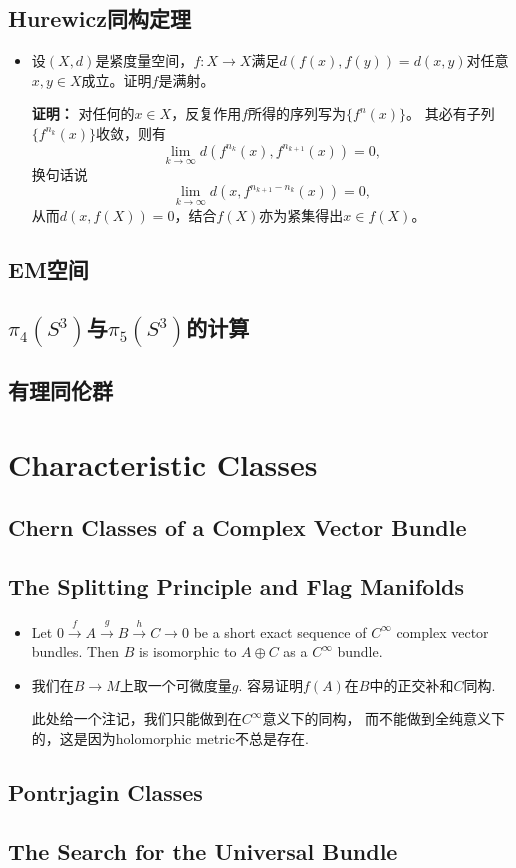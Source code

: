\subsection{Hurewicz同构定理}
\begin{itemize}
    \item[17.3] 设$(X,d)$是紧度量空间，$f:X \to X$满足$d(f(x),f(y))=d(x,y)$对任意$x,y \in X$成立。证明$f$是满射。

    \textbf{证明：} 对任何的$x \in X$，反复作用$f$所得的序列写为$\{f^{n}(x)\}$。
    其必有子列$\{f^{n_k}(x)\}$收敛，则有
    \[\lim_{k\to\infty}d(f^{n_k}(x),f^{n_{k+1}}(x))=0,\]
    换句话说\[\lim_{k\to\infty}d(x,f^{n_{k+1}-n_k}(x))=0,\]
    从而$d(x,f(X))=0$，结合$f(X)$亦为紧集得出$x \in f(X)$。
\end{itemize}

\subsection{EM空间}

\subsection{$\pi_{4}(S^{3})$与$\pi_{5}(S^{3})$的计算}

\subsection{有理同伦群}

\section{Characteristic Classes}

\subsection{Chern Classes of a Complex Vector Bundle}

\subsection{The Splitting Principle and Flag Manifolds}
\begin{itemize}
    \item[21.1] Let $0\stackrel{f}{\longrightarrow} A
    \stackrel{g}{\longrightarrow} B\stackrel{h}{\longrightarrow} C\rightarrow 0$ 
    be a short exact sequence of $C^\infty$ complex vector bundles. 
    Then $B$ is isomorphic to $A\oplus C$ as a $C^\infty$ bundle.

    \item[\textbf{证明:}]  
        \qquad 我们在$B\rightarrow M$上取一个可微度量$g$. 
        容易证明$f(A)$在$B$中的正交补和$C$同构.\par
        \qquad 此处给一个注记，我们只能做到在$C^\infty$意义下的同构，
        而不能做到全纯意义下的，这是因为holomorphic metric不总是存在. 
\end{itemize}

\subsection{Pontrjagin Classes}

\subsection{The Search for the Universal Bundle}